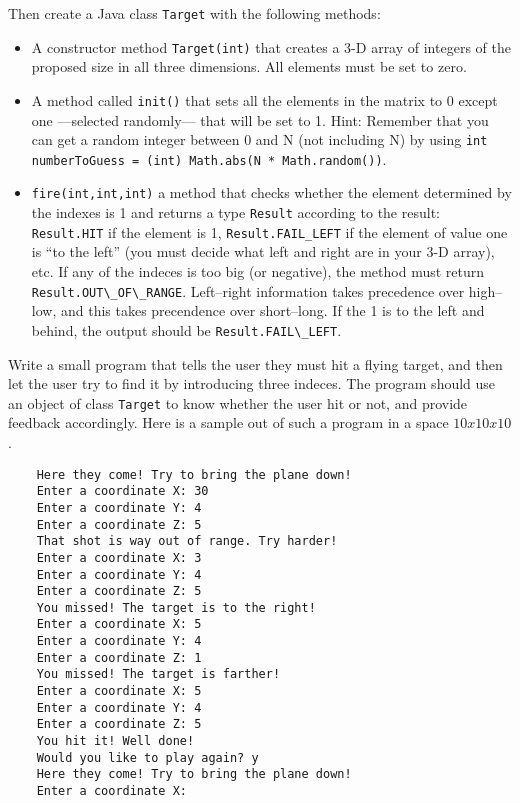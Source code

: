 \documentclass{article}
\begin{document}
Then create a Java class \verb+Target+ with the following methods: 

\begin{itemize}
\item A constructor method \verb+Target(int)+ that creates a 3-D array 
  of integers of the
  proposed size in all three dimensions. All elements must be set to
  zero.
\item A method called \verb+init()+ 
  that sets all the elements in the matrix to 0 except one
  ---selected randomly--- that will be set to 1. 
  Hint: Remember that you can get a random
  integer between 0 and N (not including N) by
  using \verb+int numberToGuess = (int) Math.abs(N * Math.random())+.
\item \verb+fire(int,int,int)+ a method that checks whether the
  element determined by the indexes is 1 and returns a type
  \verb+Result+ according to the result: \verb+Result.HIT+ if the
  element is 1, \verb+Result.FAIL_LEFT+ if the element of value one is
  ``to the left'' (you must decide what left and right are in your 3-D
  array), etc. If any of the indeces is too big (or negative), the
  method must return \verb+Result.OUT\_OF\_RANGE+. Left--right
  information takes precedence over high--low, and this takes
  precendence over short--long. If the 1 is to the left and behind,
  the output should be \verb+Result.FAIL\_LEFT+.
\end{itemize}

Write a small program that tells the user they must hit a flying
target, and then let the user try to find it by introducing three
indeces. The program should use an object of class \verb+Target+ to
know whether the user hit or not, and provide feedback
accordingly. Here is a sample out of such a program in a space $10 x
10 x 10$. 

\begin{verbatim}
    Here they come! Try to bring the plane down!
    Enter a coordinate X: 30
    Enter a coordinate Y: 4
    Enter a coordinate Z: 5
    That shot is way out of range. Try harder!
    Enter a coordinate X: 3
    Enter a coordinate Y: 4
    Enter a coordinate Z: 5
    You missed! The target is to the right!
    Enter a coordinate X: 5
    Enter a coordinate Y: 4
    Enter a coordinate Z: 1
    You missed! The target is farther!
    Enter a coordinate X: 5
    Enter a coordinate Y: 4
    Enter a coordinate Z: 5
    You hit it! Well done!
    Would you like to play again? y
    Here they come! Try to bring the plane down!
    Enter a coordinate X: 
\end{verbatim}
\end{document}
